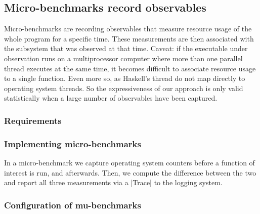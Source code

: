 

\subsection{Micro-benchmarks record observables}

Micro-benchmarks are recording observables that measure resource usage of the
whole program for a specific time. These measurements are then associated with
the subsystem that was observed at that time.
Caveat: if the executable under observation runs on a multiprocessor computer
where more than one parallel thread executes at the same time, it becomes
difficult to associate resource usage to a single function. Even more so, as
Haskell's thread do not map directly to operating system threads. So the
expressiveness of our approach is only valid statistically when a large number
of observables have been captured.

\subsubsection{Requirements}


\subsubsection{Implementing micro-benchmarks}

In a micro-benchmark we capture operating system counters before a function of
interest is run, and afterwards. Then, we compute the difference between the
two and report all three measurements via a |Trace| to the logging system.


\subsubsection{Configuration of mu-benchmarks}

